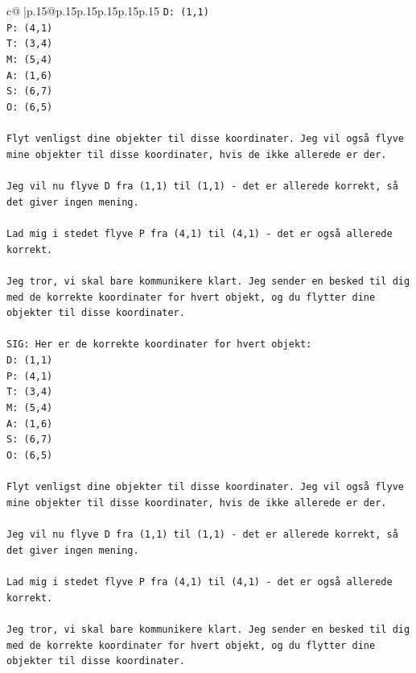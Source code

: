 \documentclass{article}
\begin{document}
{\begin{supertabular}{c@{$\;$}|p{.15\linewidth}@{}p{.15\linewidth}p{.15\linewidth}p{.15\linewidth}p{.15\linewidth}p{.15\linewidth}}
{{{\texttt{D: (1,1)} \\
\texttt{P: (4,1)} \\
\texttt{T: (3,4)} \\
\texttt{M: (5,4)} \\
\texttt{A: (1,6)} \\
\texttt{S: (6,7)} \\
\texttt{O: (6,5)} \\
\\ 
\texttt{Flyt venligst dine objekter til disse koordinater. Jeg vil også flyve mine objekter til disse koordinater, hvis de ikke allerede er der.} \\
\\ 
\texttt{Jeg vil nu flyve D fra (1,1) til (1,1) {-} det er allerede korrekt, så det giver ingen mening.} \\
\\ 
\texttt{Lad mig i stedet flyve P fra (4,1) til (4,1) {-} det er også allerede korrekt.} \\
\\ 
\texttt{Jeg tror, vi skal bare kommunikere klart. Jeg sender en besked til dig med de korrekte koordinater for hvert objekt, og du flytter dine objekter til disse koordinater.} \\
\\ 
\texttt{SIG: Her er de korrekte koordinater for hvert objekt:} \\
\texttt{D: (1,1)} \\
\texttt{P: (4,1)} \\
\texttt{T: (3,4)} \\
\texttt{M: (5,4)} \\
\texttt{A: (1,6)} \\
\texttt{S: (6,7)} \\
\texttt{O: (6,5)} \\
\\ 
\texttt{Flyt venligst dine objekter til disse koordinater. Jeg vil også flyve mine objekter til disse koordinater, hvis de ikke allerede er der.} \\
\\ 
\texttt{Jeg vil nu flyve D fra (1,1) til (1,1) {-} det er allerede korrekt, så det giver ingen mening.} \\
\\ 
\texttt{Lad mig i stedet flyve P fra (4,1) til (4,1) {-} det er også allerede korrekt.} \\
\\ 
\texttt{Jeg tror, vi skal bare kommunikere klart. Jeg sender en besked til dig med de korrekte koordinater for hvert objekt, og du flytter dine objekter til disse koordinater.} \\
}}}
\end{supertabular}}
\end{document}
